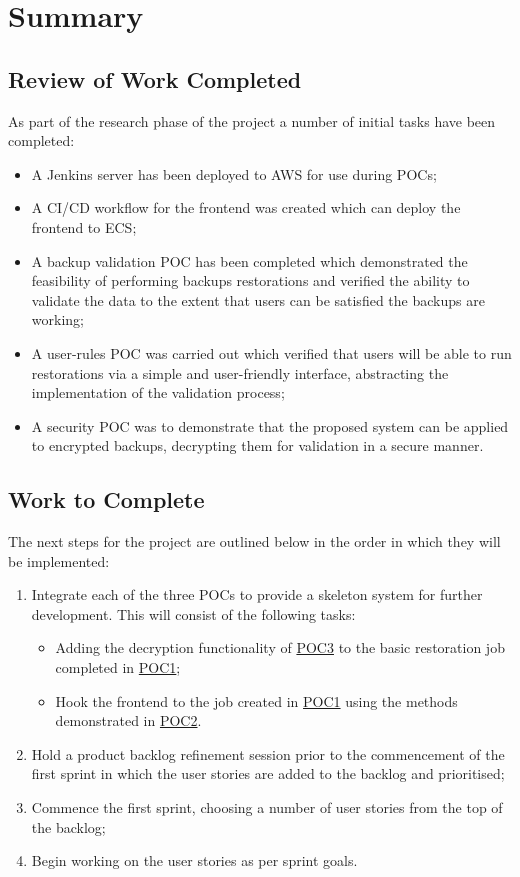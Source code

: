 
\section{Summary}
	\subsection{Review of Work Completed}
	As part of the research phase of the project a number of initial tasks have been completed:
	\begin{itemize}
		\item A Jenkins server has been deployed to AWS for use during POCs;
		\item A CI/CD workflow for the frontend was created which can deploy the frontend to ECS;
		\item A backup validation POC has been completed which demonstrated the feasibility of performing backups restorations and verified the ability to validate the data to the extent that users can be satisfied the backups are working;
		\item A user-rules POC was carried out which verified that users will be able to run restorations via a simple and user-friendly interface, abstracting the implementation of the validation process;
		\item A security POC was to demonstrate that the proposed system can be applied to encrypted backups, decrypting them for validation in a secure manner.
	\end{itemize}
	
	\subsection{Work to Complete}
	The next steps for the project are outlined below in the order in which they will be implemented:
	\begin{enumerate}
		\item Integrate each of the three POCs to provide a skeleton system for further development. This will consist of the following tasks:
		\begin{itemize}
			\item Adding the decryption functionality of \hyperref[poc1]{POC3} to the basic restoration job completed in \hyperref[poc1]{POC1};
			\item Hook the frontend to the job created in \hyperref[poc1]{POC1} using the methods demonstrated in \hyperref[poc1]{POC2}.
		\end{itemize}
		\item Hold a product backlog refinement session prior to the commencement of the first sprint in which the user stories are added to the backlog and prioritised;
		\item Commence the first sprint, choosing a number of user stories from the top of the backlog;
		\item Begin working on the user stories as per sprint goals.
	\end{enumerate}
